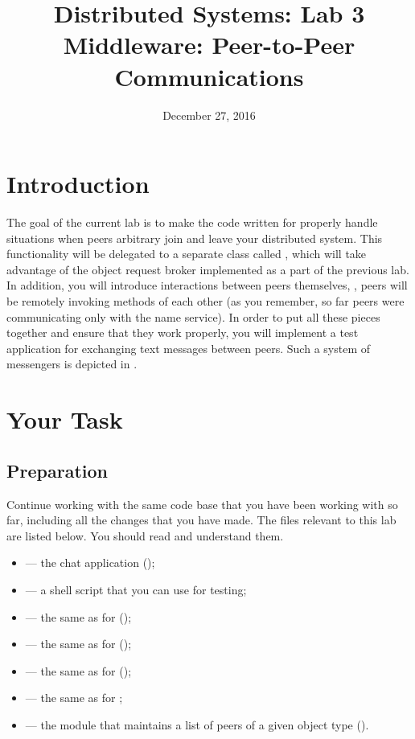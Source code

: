 \documentclass[a4paper]{article}
\title{%
  Distributed Systems: Lab 3\\%
  Middleware: Peer-to-Peer Communications%
}
\author{}
\date{December 27, 2016}
\begin{document}
\maketitle

\section{Introduction}

The goal of the current lab is to make the code written for  properly
handle situations when peers arbitrary join and leave your distributed system.
This functionality will be delegated to a separate class called
, which will take advantage of the object request broker
implemented as a part of the previous lab. In addition, you will introduce
interactions between peers themselves, \ie, peers will be remotely invoking
methods \cite{lecture3} of each other (as you remember, so far peers were
communicating only with the name service). In order to put all these pieces
together and ensure that they work properly, you will implement a test
application for exchanging text messages between peers. Such a system of
messengers is depicted in .

\section{Your Task}
\subsection{Preparation}
Continue working with the same code base that you have been working with so far,
including all the changes that you have made. The files relevant to this lab are
listed below. You should read and understand them.
\begin{itemize}

  \item {} --- the chat application (\leave);

  \item {} --- a shell script that you can use for testing;

  \item {} --- the same as for
   (\leave);

  \item {} --- the same as for 
  (\overwrite);

  \item {} --- the same as for 
  (\overwrite);

  \item {} --- the same as for ;

  \item {} --- the module that maintains a
  list of peers of a given object type (\fix).

\end{itemize}
\end{document}
